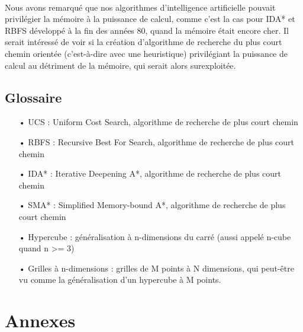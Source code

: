 \documentclass[pidr]{tnreport}
\begin{document}
\paragraph{}
Nous avons remarqué que nos algorithmes d'intelligence artificielle pouvait privilégier la mémoire à la puissance de calcul, comme c'est la cas pour IDA* et RBFS développé à la fin des années 80, quand la mémoire était encore cher. Il serait intéressé de voir si la création d'algorithme de recherche du plus court chemin orientée (c'est-à-dire avec une heuristique) privilégiant la puissance de calcul au détriment de la mémoire, qui serait alors surexploitée.


\clearpage
\renewcommand{\tocbibname}{Bibliographie / Webographie}


\clearpage

\chapter*{Glossaire}

\begin{itemize}
	\item[•] UCS : Uniform Cost Search, algorithme de recherche de plus court chemin
	\item[•] RBFS : Recursive Best For Search, algorithme de recherche de plus court chemin
	\item[•] IDA* : Iterative Deepening A*, algorithme de recherche de plus court chemin
	\item[•] SMA* : Simplified Memory-bound A*, algorithme de recherche de plus court chemin
	\item[•] Hypercube : généralisation à n-dimensions du carré (aussi appelé n-cube quand n >= 3)
	\item[•] Grilles à n-dimensions : grilles de M points à N dimensions, qui peut-être vu comme la généralisation d'un hypercube à M points.
\end{itemize}

\clearpage
\renewcommand{\thesubsection}{\Roman{subsection}}


\appendix
\part*{Annexes}
\end{document}
